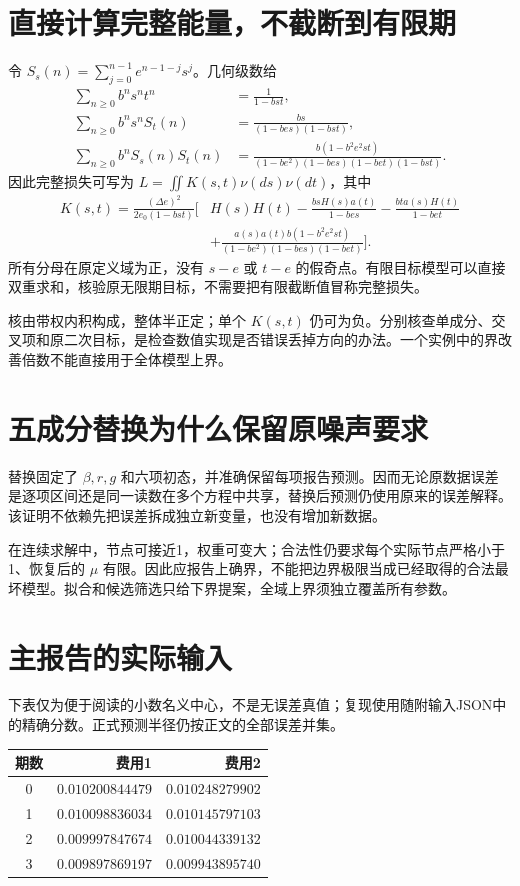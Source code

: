 \documentclass[UTF8,fontset=windows,11pt,a4paper]{ctexart}
\numberwithin{equation}{section}
\begin{document}
\section{直接计算完整能量，不截断到有限期}
令 $S_s(n)=\sum_{j=0}^{n-1}e^{n-1-j}s^j$。几何级数给
\begin{align}
 \sum_{n\ge0}b^ns^nt^n&=\frac1{1-bst},\\
 \sum_{n\ge0}b^ns^nS_t(n)&=\frac{bs}{(1-bes)(1-bst)},\\
 \sum_{n\ge0}b^nS_s(n)S_t(n)
 &=\frac{b(1-b^2e^2st)}{(1-be^2)(1-bes)(1-bet)(1-bst)}.
\end{align}
因此完整损失可写为 $L=\iint K(s,t)\nu(ds)\nu(dt)$，其中
\begin{align}
 K(s,t)=\frac{(\Delta e)^2}{2e_0(1-bst)}
 \bigg[&H(s)H(t)-\frac{bsH(s)a(t)}{1-bes}
 -\frac{bta(s)H(t)}{1-bet}\\
 &+\frac{a(s)a(t)b(1-b^2e^2st)}
 {(1-be^2)(1-bes)(1-bet)}\bigg].
\end{align}
所有分母在原定义域为正，没有 $s-e$ 或 $t-e$ 的假奇点。有限目标模型可以直接双重求和，核验原无限期目标，不需要把有限截断值冒称完整损失。

核由带权内积构成，整体半正定；单个 $K(s,t)$ 仍可为负。分别核查单成分、交叉项和原二次目标，是检查数值实现是否错误丢掉方向的办法。一个实例中的界改善倍数不能直接用于全体模型上界。

\section{五成分替换为什么保留原噪声要求}
替换固定了 $\beta,r,g$ 和六项初态，并准确保留每项报告预测。因而无论原数据误差是逐项区间还是同一读数在多个方程中共享，替换后预测仍使用原来的误差解释。该证明不依赖先把误差拆成独立新变量，也没有增加新数据。

在连续求解中，节点可接近1，权重可变大；合法性仍要求每个实际节点严格小于1、恢复后的 $\mu$ 有限。因此应报告上确界，不能把边界极限当成已经取得的合法最坏模型。拟合和候选筛选只给下界提案，全域上界须独立覆盖所有参数。

\section{主报告的实际输入}
下表仅为便于阅读的小数名义中心，不是无误差真值；复现使用随附输入JSON中的精确分数。正式预测半径仍按正文的全部误差并集。
\begin{center}\begin{tabular}{crr}\toprule
期数 & 费用1 & 费用2\\\midrule
0 & $0.010200844479$ & $0.010248279902$\\
1 & $0.010098836034$ & $0.010145797103$\\
2 & $0.009997847674$ & $0.010044339132$\\
3 & $0.009897869197$ & $0.009943895740$\\
\bottomrule\end{tabular}\end{center}
\end{document}
